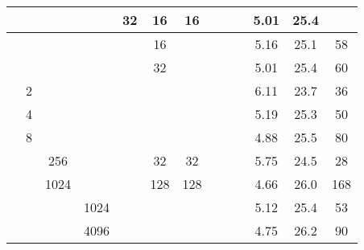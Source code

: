 \begin{table}[t]
\begin{center}
\begin{tabular}{c|ccccccccc|ccc}
                                  &                                  &                                                               &        & 32   & 16  & 16  &     &     &       & 5.01          & 25.4          &              \\
      \hline\rule{0pt}{2.0ex}
      \multirow{2}{*}{(B)}
                                  &                                  &                                                               &        &      & 16  &     &     &     &       & 5.16          & 25.1          & 58           \\
                                  &                                  &                                                               &        &      & 32  &     &     &     &       & 5.01          & 25.4          & 60           \\
      \hline\rule{0pt}{2.0ex}
      \multirow{7}{*}{(C)}
                                  & 2                                &                                                               &        &      &     &     &     &     &       & 6.11          & 23.7          & 36           \\
                                  & 4                                &                                                               &        &      &     &     &     &     &       & 5.19          & 25.3          & 50           \\
                                  & 8                                &                                                               &        &      &     &     &     &     &       & 4.88          & 25.5          & 80           \\
                                  &                                  & 256                                                           &        &      & 32  & 32  &     &     &       & 5.75          & 24.5          & 28           \\
                                  &                                  & 1024                                                          &        &      & 128 & 128 &     &     &       & 4.66          & 26.0          & 168          \\
                                  &                                  &                                                               & 1024   &      &     &     &     &     &       & 5.12          & 25.4          & 53           \\
                                  &                                  &                                                               & 4096   &      &     &     &     &     &       & 4.75          & 26.2          & 90           \\

\end{tabular}
\end{center}
\end{table}
